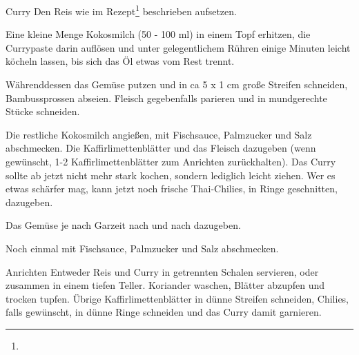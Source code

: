\begin{recipestep}{Curry}
  Den Reis wie im Rezept\footnote{} beschrieben aufsetzen.\par
  Eine kleine Menge Kokosmilch (50 - 100 \si{\milli\litre}) in einem Topf erhitzen, die Currypaste darin auflösen
  und unter gelegentlichem Rühren einige Minuten leicht köcheln lassen, bis sich das Öl etwas vom Rest trennt.\par

  Währenddessen das Gemüse putzen und in ca 5 x 1 \si{\centi\metre} große Streifen schneiden, Bambussprossen abseien.
  Fleisch gegebenfalls parieren und in mundgerechte Stücke schneiden.\par

  Die restliche Kokosmilch angießen, mit Fischsauce, Palmzucker und Salz abschmecken. Die Kaffirlimettenblätter und
  das Fleisch dazugeben (wenn gewünscht, 1-2 Kaffirlimettenblätter zum Anrichten zurückhalten).
  Das Curry sollte ab jetzt nicht mehr stark kochen, sondern lediglich leicht ziehen.
  Wer es etwas schärfer mag, kann jetzt noch frische Thai-Chilies, in Ringe geschnitten, dazugeben.\par

  Das Gemüse je nach Garzeit nach und nach dazugeben.

  Noch einmal mit Fischsauce, Palmzucker und Salz abschmecken.
\end{recipestep}

\begin{recipestep}{Anrichten}
  Entweder Reis und Curry in getrennten Schalen servieren, oder zusammen in einem tiefen Teller.
  Koriander waschen, Blätter abzupfen und trocken tupfen. Übrige Kaffirlimettenblätter in dünne Streifen schneiden,
  Chilies, falls gewünscht, in dünne Ringe schneiden und das Curry damit garnieren.
\end{recipestep}
